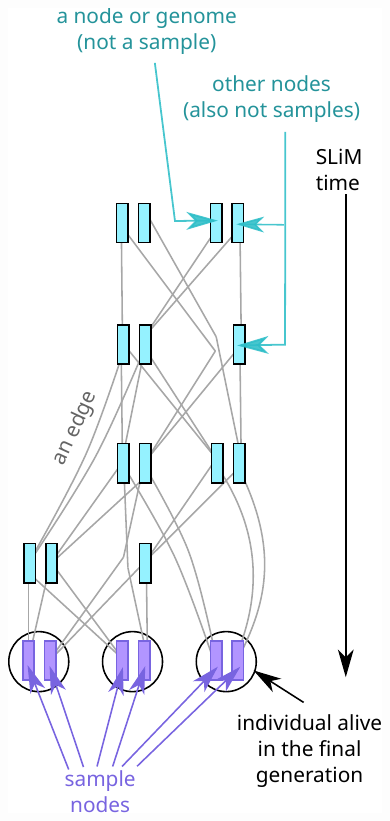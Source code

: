 \documentclass[12pt]{article}
\begin{document}
\begin{figure}
    \includegraphics{figures/pedigree2}

\end{figure}
\end{document}
